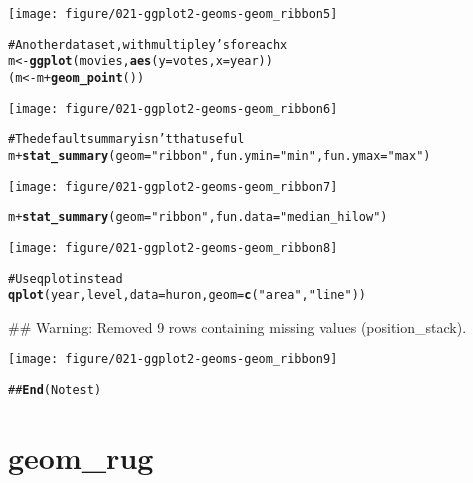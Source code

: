 \documentclass[a4paper,titlepage]{tufte-handout}\usepackage{graphicx, color}
\makeatletter
\def\maxwidth{ %
  \ifdim\Gin@nat@width>\linewidth
    \linewidth
  \else
    \Gin@nat@width
  \fi
}
\newcommand{\hlfunctioncall}[1]{\textcolor[rgb]{0.501960784313725,0,0.329411764705882}{\textbf{#1}}}%
\newcommand{\hlstring}[1]{\textcolor[rgb]{0.6,0.6,1}{#1}}%
\newcommand{\hlcomment}[1]{\textcolor[rgb]{0.180392156862745,0.6,0.341176470588235}{#1}}%
\newenvironment{kframe}{%
 \def\at@end@of@kframe{}%
 \ifinner\ifhmode%
  \def\at@end@of@kframe{\end{minipage}}%
  \begin{minipage}{\columnwidth}%
 \fi\fi%
 \def\FrameCommand##1{\hskip\@totalleftmargin \hskip-\fboxsep
 \colorbox{shadecolor}{##1}\hskip-\fboxsep
     \hskip-\linewidth \hskip-\@totalleftmargin \hskip\columnwidth}%
 \MakeFramed {\advance\hsize-\width
   \@totalleftmargin\z@ \linewidth\hsize
   \@setminipage}}%
 {\par\unskip\endMakeFramed%
 \at@end@of@kframe}
\newenvironment{knitrout}{}{} %
\makeatother
\begin{document}
\begin{knitrout}
\begin{kframe}
\begin{alltt}
\end{alltt}
\end{kframe}\texttt{[image: figure/021-ggplot2-geoms-geom\_ribbon5]} \begin{kframe}\begin{alltt}
\hlcomment{# Another data set, with multiple y's for each x}
m <- \hlfunctioncall{ggplot}(movies, \hlfunctioncall{aes}(y=votes, x=year))
(m <- m + \hlfunctioncall{geom_point}())
\end{alltt}
\end{kframe}\texttt{[image: figure/021-ggplot2-geoms-geom\_ribbon6]} \begin{kframe}\begin{alltt}
\hlcomment{# The default summary isn't that useful}
m + \hlfunctioncall{stat_summary}(geom=\hlstring{"ribbon"}, fun.ymin=\hlstring{"min"}, fun.ymax=\hlstring{"max"})
\end{alltt}
\end{kframe}\texttt{[image: figure/021-ggplot2-geoms-geom\_ribbon7]} \begin{kframe}\begin{alltt}
m + \hlfunctioncall{stat_summary}(geom=\hlstring{"ribbon"}, fun.data=\hlstring{"median_hilow"})
\end{alltt}
\end{kframe}\texttt{[image: figure/021-ggplot2-geoms-geom\_ribbon8]} \begin{kframe}\begin{alltt}
\hlcomment{# Use qplot instead}
\hlfunctioncall{qplot}(year, level, data=huron, geom=\hlfunctioncall{c}(\hlstring{"area"}, \hlstring{"line"}))
\end{alltt}


{\ttfamily\noindent\textcolor{warningcolor}{\#\# Warning: Removed 9 rows containing missing values (position\_stack).}}\end{kframe}\texttt{[image: figure/021-ggplot2-geoms-geom\_ribbon9]} \begin{kframe}\begin{alltt}
\hlcomment{## \hlfunctioncall{End}(No test)}
\end{alltt}
\end{kframe}
\end{knitrout}


\section{geom\_rug}
\end{document}
